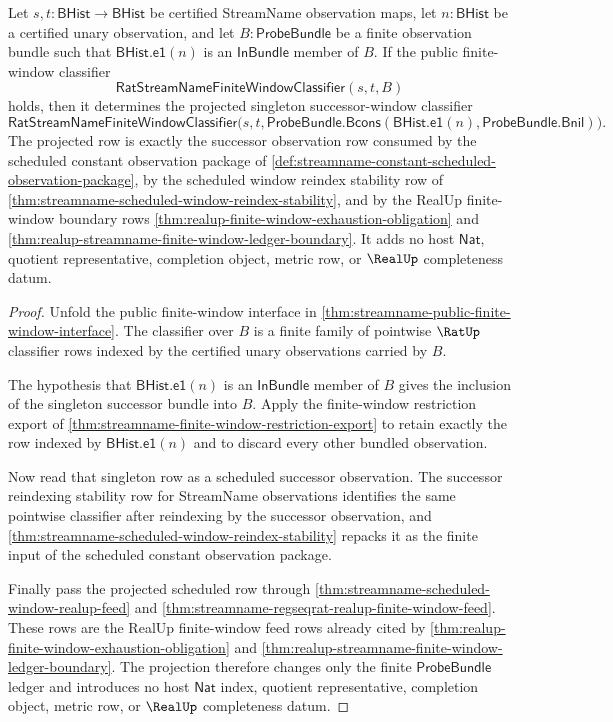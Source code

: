 \begin{theorem}
\label{thm:streamname-successor-window-projection-determinacy}
Let $s,t:\mathsf{BHist}\to\mathsf{BHist}$ be certified StreamName observation
maps, let $n:\mathsf{BHist}$ be a certified unary observation, and let
$B:\mathsf{ProbeBundle}$ be a finite observation bundle such that
$\mathsf{BHist.e1}(n)$ is an $\mathsf{InBundle}$ member of $B$. If the public
finite-window classifier
$$
\mathsf{RatStreamNameFiniteWindowClassifier}(s,t,B)
$$
holds, then it determines the projected singleton successor-window classifier
$$
\mathsf{RatStreamNameFiniteWindowClassifier}
\bigl(s,t,\mathsf{ProbeBundle.Bcons}(\mathsf{BHist.e1}(n),\mathsf{ProbeBundle.Bnil})\bigr).
$$
The projected row is exactly the successor observation row consumed by the
scheduled constant observation package of
\autoref{def:streamname-constant-scheduled-observation-package}, by the
scheduled window reindex stability row of
\autoref{thm:streamname-scheduled-window-reindex-stability}, and by the RealUp
finite-window boundary rows
\autoref{thm:realup-finite-window-exhaustion-obligation} and
\autoref{thm:realup-streamname-finite-window-ledger-boundary}. It adds no host
$\mathsf{Nat}$, quotient representative, completion object, metric row, or
$\RealUp$ completeness datum.
\end{theorem}

\begin{proof}
Unfold the public finite-window interface in
\autoref{thm:streamname-public-finite-window-interface}. The classifier over
$B$ is a finite family of pointwise $\RatUp$ classifier rows indexed by the
certified unary observations carried by $B$.

The hypothesis that $\mathsf{BHist.e1}(n)$ is an $\mathsf{InBundle}$ member of
$B$ gives the inclusion of the singleton successor bundle into $B$. Apply the
finite-window restriction export of
\autoref{thm:streamname-finite-window-restriction-export} to retain exactly the
row indexed by $\mathsf{BHist.e1}(n)$ and to discard every other bundled
observation.

Now read that singleton row as a scheduled successor observation. The
successor reindexing stability row for StreamName observations identifies the
same pointwise classifier after reindexing by the successor observation, and
\autoref{thm:streamname-scheduled-window-reindex-stability} repacks it as the
finite input of the scheduled constant observation package.

Finally pass the projected scheduled row through
\autoref{thm:streamname-scheduled-window-realup-feed} and
\autoref{thm:streamname-regseqrat-realup-finite-window-feed}. These rows are
the RealUp finite-window feed rows already cited by
\autoref{thm:realup-finite-window-exhaustion-obligation} and
\autoref{thm:realup-streamname-finite-window-ledger-boundary}. The projection
therefore changes only the finite $\mathsf{ProbeBundle}$ ledger and introduces
no host $\mathsf{Nat}$ index, quotient representative, completion object,
metric row, or $\RealUp$ completeness datum.
\end{proof}
